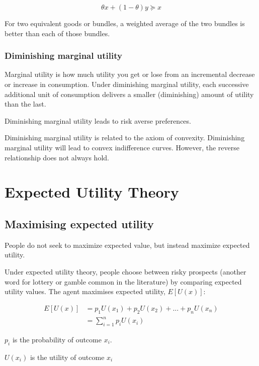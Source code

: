 \documentclass[
  letterpaper,
  DIV=11,
  numbers=noendperiod]{scrreprt}
\begin{document}
\[\theta x+(1-\theta)y\succcurlyeq x\]

For two equivalent goods or bundles, a weighted average of the two
bundles is better than each of those bundles.

\hypertarget{diminishing-marginal-utility}{%
\subsection{Diminishing marginal
utility}\label{diminishing-marginal-utility}}

Marginal utility is how much utility you get or lose from an incremental
decrease or increase in consumption. Under diminishing marginal utility,
each successive additional unit of consumption delivers a smaller
(diminishing) amount of utility than the last.

Diminishing marginal utility leads to risk averse preferences.

Diminishing marginal utility is related to the axiom of convexity.
Diminishing marginal utility will lead to convex indifference curves.
However, the reverse relationship does not always hold.

\hypertarget{expected-utility-theory}{%
\chapter{Expected Utility Theory}\label{expected-utility-theory}}

\hypertarget{maximising-expected-utility}{%
\section{Maximising expected
utility}\label{maximising-expected-utility}}

People do not seek to maximize expected value, but instead maximize
expected utility.

Under expected utility theory, people choose between risky prospects
(another word for lottery or gamble common in the literature) by
comparing expected utility values. The agent maximises expected utility,
\(E[U(x)]\):

\begin{align*}
E[U(x)]&=p_1U(x_1)+p_2U(x_2)+ ... +p_nU(x_n) \\[6pt]
&=\sum_{i=1}^n p_iU(x_i)
\end{align*}

\(p_i\) is the probability of outcome \(x_i\).

\(U(x_i)\) is the utility of outcome \(x_i\)
\end{document}
